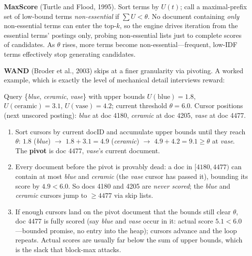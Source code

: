 \textbf{MaxScore} (Turtle and Flood, 1995). Sort terms by $U(t)$; call a maximal-prefix set of low-bound terms \emph{non-essential} if $\sum U < \theta$. No document containing \emph{only} non-essential terms can enter the top-$k$, so the engine drives iteration from the essential terms' postings only, probing non-essential lists just to complete scores of candidates. As $\theta$ rises, more terms become non-essential---frequent, low-IDF terms effectively stop generating candidates.

\textbf{WAND} (Broder et al., 2003) skips at a finer granularity via pivoting. A worked example, which is exactly the level of mechanical detail interviews reward:

Query \{\emph{blue}, \emph{ceramic}, \emph{vase}\} with upper bounds $U(\text{blue}) = 1.8$, $U(\text{ceramic}) = 3.1$, $U(\text{vase}) = 4.2$; current threshold $\theta = 6.0$. Cursor positions (next unscored posting): \emph{blue} at doc 4180, \emph{ceramic} at doc 4205, \emph{vase} at doc 4477.

\begin{enumerate}
    \item Sort cursors by current docID and accumulate upper bounds until they reach $\theta$: $1.8$ (\emph{blue}) $\rightarrow$ $1.8+3.1 = 4.9$ (\emph{ceramic}) $\rightarrow$ $4.9 + 4.2 = 9.1 \ge \theta$ at \emph{vase}. The \textbf{pivot} is doc 4477, \emph{vase}'s current document.
    \item Every document before the pivot is provably dead: a doc in $[4180, 4477)$ can contain at most \emph{blue} and \emph{ceramic} (the \emph{vase} cursor has passed it), bounding its score by $4.9 < 6.0$. So docs 4180 and 4205 are \emph{never scored}; the \emph{blue} and \emph{ceramic} cursors jump to $\ge 4477$ via skip lists.
    \item If enough cursors land on the pivot document that the bounds still clear $\theta$, doc 4477 is fully scored (say \emph{blue} and \emph{vase} occur in it: actual score $5.1 < 6.0$---bounded promise, no entry into the heap); cursors advance and the loop repeats. Actual scores are usually far below the sum of upper bounds, which is the slack that block-max attacks.
\end{enumerate}

